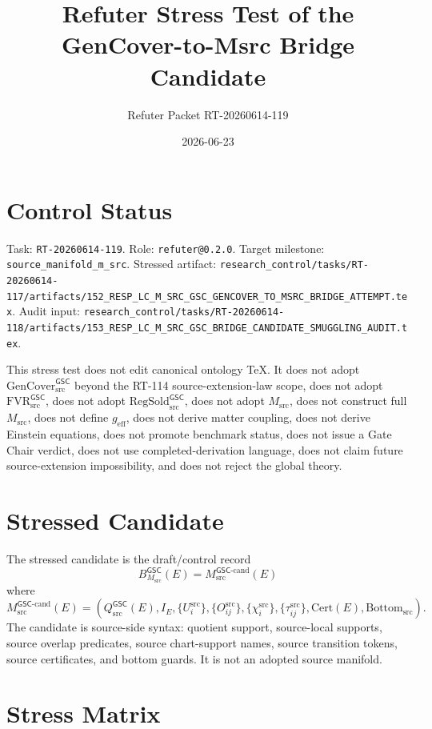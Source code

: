 \documentclass[11pt]{article}
\title{Refuter Stress Test of the GenCover-to-Msrc Bridge Candidate}
\author{Refuter Packet RT-20260614-119}
\date{2026-06-23}
\newcommand{\GSC}{\mathsf{GSC}}
\newcommand{\Msrc}{M_{\mathrm{src}}}
\newcommand{\Qsrc}{Q_{\mathrm{src}}}
\newcommand{\Bottomsrc}{\mathrm{Bottom}_{\mathrm{src}}}
\newcommand{\GenCover}{\mathrm{GenCover}_{\mathrm{src}}^{\GSC}}
\begin{document}
\maketitle

\section{Control Status}

Task: \texttt{RT-20260614-119}. Role:
\texttt{refuter@0.2.0}. Target milestone:
\texttt{source\_manifold\_m\_src}. Stressed artifact:
\texttt{research\_control/tasks/RT-20260614-117/artifacts/152\_RESP\_LC\_M\_SRC\_GSC\_GENCOVER\_TO\_MSRC\_BRIDGE\_ATTEMPT.tex}.
Audit input:
\texttt{research\_control/tasks/RT-20260614-118/artifacts/153\_RESP\_LC\_M\_SRC\_GSC\_BRIDGE\_CANDIDATE\_SMUGGLING\_AUDIT.tex}.

This stress test does not edit canonical ontology TeX. It does not adopt
\(\GenCover\) beyond the RT-114 source-extension-law scope, does not adopt
\(\mathrm{FVR}_{\mathrm{src}}^{\GSC}\), does not adopt
\(\mathrm{RegSold}_{\mathrm{src}}^{\GSC}\), does not adopt \(\Msrc\), does
not construct full \(\Msrc\), does not define \(g_{\mathrm{eff}}\), does not
derive matter coupling, does not derive Einstein equations, does not promote
benchmark status, does not issue a Gate Chair verdict, does not use
completed-derivation language, does not claim future source-extension
impossibility, and does not reject the global theory.

\section{Stressed Candidate}

The stressed candidate is the draft/control record
\[
  B_{\Msrc}^{\GSC}(E)=\Msrc^{\GSC\mbox{-}\mathrm{cand}}(E)
\]
where
\[
  \Msrc^{\GSC\mbox{-}\mathrm{cand}}(E)=
  \left(
  \Qsrc^{\GSC}(E),
  I_E,
  \{U_i^{\mathrm{src}}\},
  \{O_{ij}^{\mathrm{src}}\},
  \{\chi_i^{\mathrm{src}}\},
  \{\tau_{ij}^{\mathrm{src}}\},
  \mathrm{Cert}(E),
  \Bottomsrc
  \right).
\]
The candidate is source-side syntax: quotient support, source-local supports,
source overlap predicates, source chart-support names, source transition
tokens, source certificates, and bottom guards. It is not an adopted source
manifold.

\section{Stress Matrix}
\end{document}
